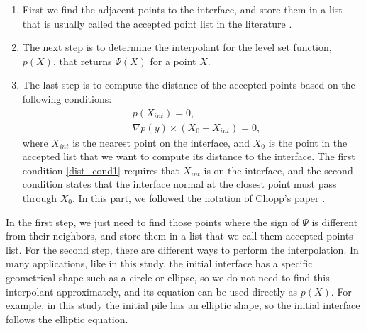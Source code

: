 \documentclass[letterpaper,10pt]{article}
\begin{document}
\begin{enumerate}
\item First we find the adjacent points to the interface, and store them in a list that is usually called the accepted point list in the literature \cite{Chopp2001}. 
\item The next step is to determine the interpolant for the level set function, $p(X)$, that returns $\varPsi(X)$ for a point $X$.
\item The last step is to compute the distance of the accepted points based on the following conditions:
\begin{subequations}
\begin{align}
&p(X_{int})=0,\label{dist_cond1} \\ 
&\nabla p(y) \times (X_0-X_{int})=0,\label{dist_cond2}
\end{align}
\end{subequations}
where $X_{int}$ is the nearest point on the interface, and $X_0$ is the point in the accepted list that we want to compute its distance to the interface. 
The first condition \eqref{dist_cond1} requires that $X_{int}$ is on the interface, and the second condition states that the interface normal at the closest point 
must pass through $X_0$. In this part, we followed the notation of Chopp's paper \citep{Chopp2001}.
\end{enumerate}

In the first step, we just need to find those points where the sign of $\varPsi$ is different from their neighbors, and store them in a list that we call them accepted points list. 
For the second step, there are different ways to perform the interpolation. In many applications, like in this study, the initial interface has a specific geometrical shape such as a circle or ellipse, 
so we do not need to find this interpolant approximately, and its equation can be used directly as $p(X)$. 
For example, in this study the initial pile has an elliptic shape, so the initial interface follows the elliptic equation. 
\end{document}
